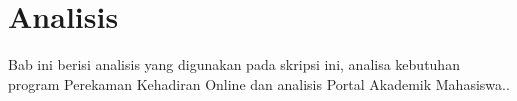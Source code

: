 \chapter{Analisis}
\label{chap:analisis}
Bab ini berisi analisis yang digunakan pada skripsi ini, analisa kebutuhan program Perekaman Kehadiran Online dan analisis Portal Akademik Mahasiswa.. 
